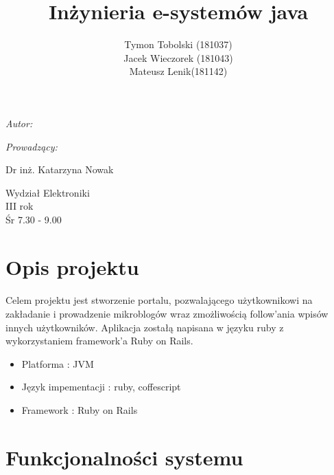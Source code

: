 \documentclass[wide,a4paper,titlepage,12pt] {article}
\title{Inżynieria e-systemów java}
\author{Tymon Tobolski (181037)\\ Jacek Wieczorek (181043) \\ Mateusz Lenik(181142)}
\makeatletter
\renewcommand{\maketitle}{
\begin{titlepage}
  \begin{center}
    \vspace*{3cm}
    \LARGE \@title \par
    \vspace{2cm}
    \textit{\small Autor:}\par
    \normalsize \@author\par \normalsize
    \vspace{3cm}
    \textit{\small Prowadzący:}\par
    Dr inż. Katarzyna Nowak \par
    \vspace{2cm}
    Wydział Elektroniki\\ III rok\\ Śr 7.30 - 9.00\par

  \end{center}
\end{titlepage}
}
\makeatother
\begin{document}
  \maketitle
  \tableofcontents
  \newpage

  \section{Opis projektu}
  \paragraph{}
  Celem projektu jest stworzenie portalu, pozwalającego użytkownikowi na zakładanie i prowadzenie mikroblogów wraz zmożliwością follow'ania wpisów innych użytkowników. Aplikacja zostałą napisana w języku ruby z wykorzystaniem framework'a Ruby on Rails.
  \begin{itemize}
    \item Platforma : JVM
    \item Język impementacji : ruby, coffescript
    \item Framework : Ruby on Rails 
  \end{itemize}
  \section{Funkcjonalności systemu}
\end{document}
